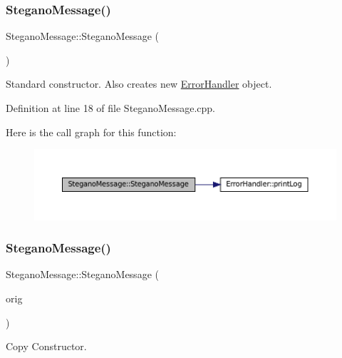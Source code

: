 \subsubsection{\texorpdfstring{SteganoMessage()}{SteganoMessage()}\hspace{0.1cm}{\footnotesize\ttfamily [1/2]}}
{\footnotesize\ttfamily Stegano\+Message\+::\+Stegano\+Message (\begin{DoxyParamCaption}{ }\end{DoxyParamCaption})}



Standard constructor. Also creates new \mbox{\hyperlink{classErrorHandler}{Error\+Handler}} object. 



Definition at line 18 of file Stegano\+Message.\+cpp.

Here is the call graph for this function\+:
\nopagebreak
\begin{figure}[H]
\begin{center}
\leavevmode
\includegraphics[width=350pt]{classSteganoMessage_a7a14cbd03ebca6764f8b234f8dcd1697_cgraph}
\end{center}
\end{figure}
\mbox{\label{classSteganoMessage_a67a8a4a8aae12db32bb758e6cd44b16a}} 
\subsubsection{\texorpdfstring{SteganoMessage()}{SteganoMessage()}\hspace{0.1cm}{\footnotesize\ttfamily [2/2]}}
{\footnotesize\ttfamily Stegano\+Message\+::\+Stegano\+Message (\begin{DoxyParamCaption}\item[{const \mbox{\hyperlink{classSteganoMessage}{Stegano\+Message}} \&}]{orig }\end{DoxyParamCaption})}



Copy Constructor. 


